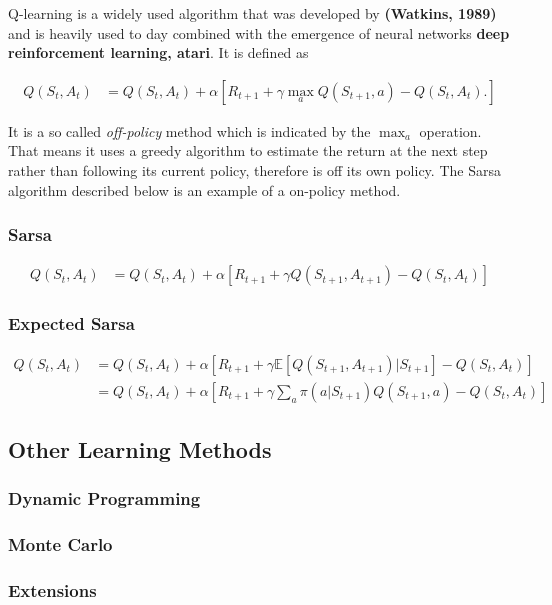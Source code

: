 \documentclass[result.tex]{subfiles}
\begin{document}
    Q-learning is a widely used algorithm that was developed by \textbf{(Watkins, 1989)} and is heavily used to day combined with the emergence of neural networks \textbf{deep reinforcement learning, atari}. It is defined as

    \begin{align*}
        Q(S_t, A_t) &=
        Q(S_t , A_t) +
        \alpha \left[
        R_{t + 1} +
        \gamma \max_a Q(S_{t + 1}, a) - Q(S_t, A_t).
        \right]
    \end{align*}

    It is a so called \textit{off-policy} method which is indicated by the $\max_a$ operation. That means it uses a greedy algorithm to estimate the return at the next step rather than following its current policy, therefore is off its own policy. The Sarsa algorithm described below is an example of a on-policy method.

    \subsubsection*{Sarsa}

    \begin{align*}
        Q(S_t, A_t) &=
        Q(S_t , A_t) +
        \alpha \left[
        R_{t + 1} +
        \gamma Q(S_{t + 1}, A_{t + 1}) - Q(S_t, A_t)
        \right]
    \end{align*}

    \subsubsection*{Expected Sarsa}

    \begin{align*}
        Q(S_t, A_t) &=
        Q(S_t , A_t) +
        \alpha \left[
        R_{t + 1} +
        \gamma \mathbb{E} \left[ Q(S_{t + 1}, A_{t + 1}) | S_{t + 1}
        \right] -
        Q(S_t, A_t)
        \right] \\
        &=
        Q(S_t , A_t) +
        \alpha \left[
        R_{t + 1} +
        \gamma \sum_a \pi (a | S_{t + 1}) Q(S_{t + 1}, a) -
        Q(S_t, A_t)
        \right]
    \end{align*}

    \subsection*{Other Learning Methods}

    \subsubsection*{Dynamic Programming}

    \subsubsection*{Monte Carlo}

    \subsubsection*{Extensions}
\end{document}
